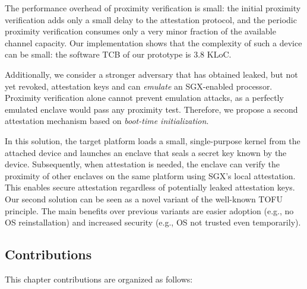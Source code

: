 The performance overhead of proximity verification is small: the initial
proximity verification adds only a small delay to the attestation protocol, and
the periodic proximity verification consumes only a very minor fraction of
the available  channel capacity. Our implementation shows that the complexity of such a device can be small: the software TCB of our prototype is 3.8 KLoC.


 Additionally, we consider a stronger adversary that has obtained leaked, but not yet revoked, attestation keys and can \emph{emulate} an SGX-enabled processor.
%
Proximity verification alone cannot prevent emulation attacks, as a perfectly emulated enclave would pass any proximity test. Therefore, we propose a second attestation mechanism based on \emph{boot-time initialization}. 

In this solution, the target platform loads a small, single-purpose kernel from the attached device and launches an enclave that seals a secret key known by the device. 
Subsequently, when attestation is needed, the enclave can verify the proximity of other enclaves on the same platform using SGX's local attestation. This enables secure attestation regardless of potentially leaked attestation keys. Our second solution can be seen as a novel variant of the well-known TOFU principle. The main benefits over previous variants are easier adoption (e.g., no OS reinstallation) and increased security (e.g., OS not trusted even temporarily).


\subsection{Contributions} This chapter contributions are organized as follows:

